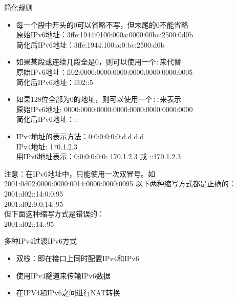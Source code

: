 简化规则
\begin{itemize}
\item 每一个段中开头的0可以省略不写，但末尾的0不能省略\\
原始IPv6地址：3ffe:1944:0100:000a:0000:00bc:2500:0d0b\\
简化后IPv6地址：3ffe:1944:100:a:0:bc:2500:d0b\\
\item 如果某段或连续几段全是0，则可以使用一个\verb':'来代替\\
原始IPv6地址：ff02:0000:0000:0000:0000:0000:0000:0005\\
简化后IPv6地址：ff02::5
\item 如果128位全部为0的地址，则可以使用一个\verb'::'来表示\\
原始IPv6地址: 0000:0000:0000:0000:0000:0000:0000:0000\\
简化后IPv6地址：::
\item IPv4地址的表示方法：0:0:0:0:0:0:d.d.d.d\\
IPv4地址: 170.1.2.3\\
用IPv6地址表示：0:0:0:0:0:0: 170.1.2.3 或 ::170.1.2.3
\end{itemize}
注意：在IPv6地址中，只能使用一次双冒号。如2001:0d02:0000:0000:0014:0000:0000:0095
以下两种缩写方式都是正确的：\\
2001:d02::14:0:0:95\\
2001:d02:0:0:14::95\\
但下面这种缩写方式是错误的：\\
2001:d02::14::95

多种IPv4过渡IPv6方式
\begin{itemize}
\item 双栈：即在接口上同时配置IPv4和IPv6
\item 使用IPv4隧道来传输IPv6数据
\item 在IPV4和IPv6之间进行NAT转换
\end{itemize}
